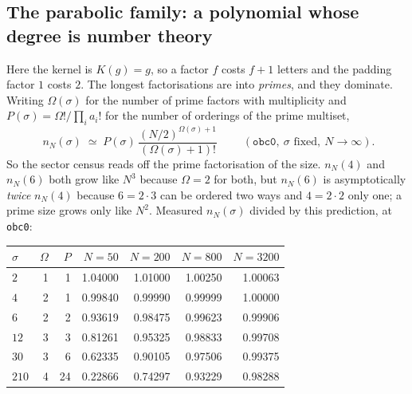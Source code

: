\documentclass[11pt]{article}
\newcommand{\rt}[1]{\texttt{#1}}
\theoremstyle{plain}
\theoremstyle{remark}
\begin{document}
\subsection{The parabolic family: a polynomial whose degree is number theory}

Here the kernel is $K(g)=g$, so a factor $f$ costs $f+1$ letters and the padding
factor $1$ costs $2$. The longest factorisations are into \emph{primes}, and they
dominate. Writing $\Omega(\sigma)$ for the number of prime factors with
multiplicity and $P(\sigma)=\Omega!/\prod_i a_i!$ for the number of orderings of
the prime multiset,
\begin{equation}
\boxed{\;
n_N(\sigma) \;\simeq\; P(\sigma)\,\frac{(N/2)^{\Omega(\sigma)+1}}{(\Omega(\sigma)+1)!}
\;}
\qquad (\rt{obc0},\ \sigma \text{ fixed},\ N\to\infty).
\end{equation}
So the sector census reads off the prime factorisation of the size. $n_N(4)$ and
$n_N(6)$ both grow like $N^3$ because $\Omega=2$ for both, but $n_N(6)$ is
asymptotically \emph{twice} $n_N(4)$ because $6=2\cdot3$ can be ordered two ways
and $4=2\cdot2$ only one; a prime size grows only like $N^2$. Measured
$n_N(\sigma)$ divided by this prediction, at \rt{obc0}:
\begin{center}
\small
\begin{tabular}{lrrrrrr}
\toprule
$\sigma$ & $\Omega$ & $P$ & $N=50$ & $N=200$ & $N=800$ & $N=3200$\\
\midrule
$2$   & 1 & 1 & 1.04000 & 1.01000 & 1.00250 & 1.00063\\
$4$   & 2 & 1 & 0.99840 & 0.99990 & 0.99999 & 1.00000\\
$6$   & 2 & 2 & 0.93619 & 0.98475 & 0.99623 & 0.99906\\
$12$  & 3 & 3 & 0.81261 & 0.95325 & 0.98833 & 0.99708\\
$30$  & 3 & 6 & 0.62335 & 0.90105 & 0.97506 & 0.99375\\
$210$ & 4 & 24& 0.22866 & 0.74297 & 0.93229 & 0.98288\\
\bottomrule
\end{tabular}
\end{center}
\end{document}
